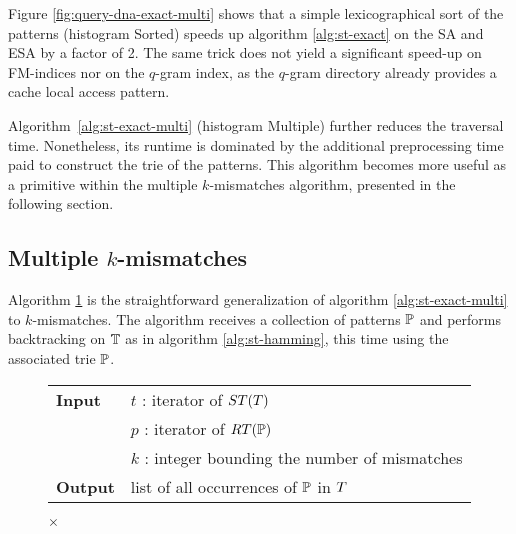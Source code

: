 Figure \ref{fig:query-dna-exact-multi} shows that a simple lexicographical sort of the patterns (histogram Sorted) speeds up algorithm \ref{alg:st-exact} on the SA and ESA by a factor of 2.
The same trick does not yield a significant speed-up on FM-indices nor on the $q$-gram index, as the $q$-gram directory already provides a cache local access pattern.

Algorithm~\ref{alg:st-exact-multi} (histogram Multiple) further reduces the traversal time.
Nonetheless, its runtime is dominated by the additional preprocessing time paid to construct the trie of the patterns.
This algorithm becomes more useful as a primitive within the multiple $k$-mismatches algorithm, presented in the following section.

\subsection{Multiple $k$-mismatches}
\label{sec:index:algo:multimismatch}

Algorithm \ref{alg:st-hamming-multi} is the straightforward generalization of algorithm \ref{alg:st-exact-multi} to $k$-mismatches.
The algorithm receives a collection of patterns $\mathbb{P}$ and performs backtracking on $\mathbb{T}$ as in algorithm  \ref{alg:st-hamming}, this time using the associated trie $\mathbb{P}$.

\begin{figure*}[b]
\begin{center}
\begin{minipage}[t]{.8\textwidth}
\begin{algorithm}[H]
\begin{tabular}{ll}
\textbf{Input}  & $t$ : iterator of $ST(T)$\\
 			    & $p$ : iterator of $RT(\mathbb{P})$\\
 			    & $k$ : integer bounding the number of mismatches\\
\textbf{Output} & list of all occurrences of $\mathbb{P}$ in $T$\\
\end{tabular}
\begin{algorithmic}[1]
\Else
		\State \Report {} $\times$ 
		\Repeat
			\Repeat
				\State {}
	\EndIf
\EndIf
\end{algorithmic}
\label{alg:st-hamming-multi}
\end{algorithm}
\end{minipage}
\end{center}
\end{figure*}

